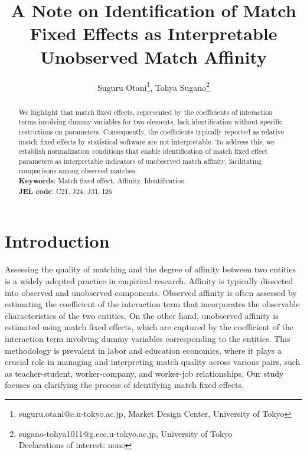 \documentclass[12pt]{article}
\begin{document}
\title{A Note on Identification of Match Fixed Effects as Interpretable Unobserved Match Affinity}
\author{Suguru Otani\thanks{suguru.otani@e.u-tokyo.ac.jp, Market Design Center, University of Tokyo}, Tohya Sugano\thanks{sugano-tohya1011@g.ecc.u-tokyo.ac.jp, University of Tokyo\\Declarations of interest: none} }
\maketitle

\begin{abstract}
\noindent
We highlight that match fixed effects, represented by the coefficients of interaction terms involving dummy variables for two elements, lack identification without specific restrictions on parameters. Consequently, the coefficients typically reported as relative match fixed effects by statistical software are not interpretable. To address this, we establish normalization conditions that enable identification of match fixed effect parameters as interpretable indicators of unobserved match affinity, facilitating comparisons among observed matches.
\\
\textbf{Keywords}: Match fixed effect, Affinity, Identification \\
\textbf{JEL code}: C21, J24, J31, I26
\end{abstract}

\section{Introduction}
Assessing the quality of matching and the degree of affinity between two entities is a widely adopted practice in empirical research. Affinity is typically dissected into observed and unobserved components. Observed affinity is often assessed by estimating the coefficient of the interaction term that incorporates the observable characteristics of the two entities. On the other hand, unobserved affinity is estimated using match fixed effects, which are captured by the coefficient of the interaction term involving dummy variables corresponding to the entities.
This methodology is prevalent in labor and education economics, where it plays a crucial role in managing and interpreting match quality across various pairs, such as teacher-student, worker-company, and worker-job relationships. Our study focuses on clarifying the process of identifying match fixed effects.
\end{document}
